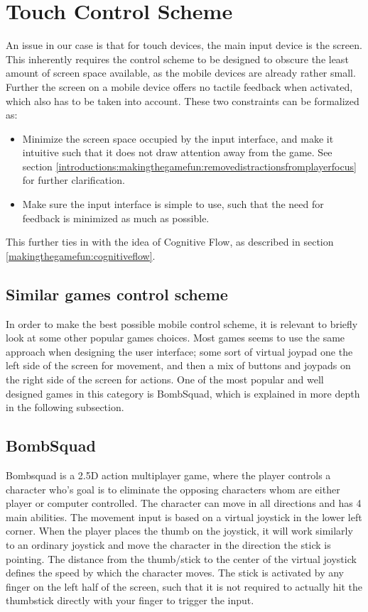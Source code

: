 \section{Touch Control Scheme}
An issue in our case is that for touch devices, the main input device is the screen.
This inherently requires the control scheme to be designed to obscure the least amount of screen space available, as the mobile devices are already rather small.
Further the screen on a mobile device offers no tactile feedback when activated, which also has to be taken into account.
These two constraints can be formalized as:
\begin{itemize}
\item Minimize the screen space occupied by the input interface, and make it intuitive such that it does not draw attention away from the game. See section \ref{introductions:makingthegamefun:removedistractionsfromplayerfocus} for further clarification.
\item Make sure the input interface is simple to use, such that the need for feedback is minimized as much as possible.
\end{itemize}
This further ties in with the idea of Cognitive Flow, as described in section \ref{makingthegamefun:cognitiveflow}.

\subsection{Similar games control scheme}
In order to make the best possible mobile control scheme, it is relevant to briefly look at some other popular games choices.
Most games seems to use the same approach when designing the user interface; some sort of virtual joypad one the left side of the screen for movement, and then a mix of buttons and joypads on the right side of the screen for actions.
One of the most popular and well designed games in this category is BombSquad, which is explained in more depth in the following subsection.

\subsection*{BombSquad}\label{sec:modules:controlscheme:bombsquad}
Bombsquad\cite{bombsquad} is a 2.5D action multiplayer game, where the player controls a character who's goal is to eliminate the opposing characters whom are either player or computer controlled.
The character can move in all directions and has 4 main abilities.
The movement input is based on a virtual joystick in the lower left corner.
When the player places the thumb on the joystick, it will work similarly to an ordinary joystick and move the character in the direction the stick is pointing. 
The distance from the thumb/stick to the center of the virtual joystick defines the speed by which the character moves. 
The stick is activated by any finger on the left half of the screen, such that it is not required to actually hit the thumbstick directly with your finger to trigger the input.

